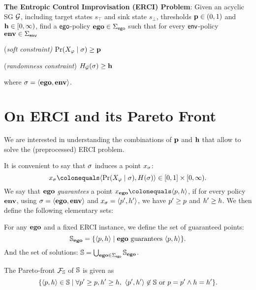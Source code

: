 {{{\begin{mdframed}
\textbf{The Entropic Control Improvisation (ERCI) Problem}:
Given an acyclic SG $\mathcal{G}$, including target states $s_\top$ and sink state $s_\bot$, thresholds $\mathbf{p} \in (0,1)$ and $\mathbf{h} \in [0,\infty)$,  find a $\mathsf{ego}$-policy $\mathbf{ego} \in \Sigma_{\mathsf{ego}}$  such that for every $\mathsf{env}$-policy $\mathbf{env} \in \Sigma_{\mathsf{env}}$ \begin{compactenum}
	\item (\emph{soft constraint)} $\Pr(X_\varphi \mid \sigma) \geq \mathbf{p}$
\item (\emph{randomness constraint}) $H_{\mathcal{G}}(\sigma) \geq \mathbf{h}$
\end{compactenum}
where  $\sigma = \langle \mathbf{ego}, \mathbf{env} \rangle$.
\end{mdframed}

\begin{example}
	
\end{example}


\section{On ERCI and its Pareto Front}

We are interested in understanding the combinations of $\mathbf{p}$ and $\mathbf{h}$ that allow to solve the (preprocessed) ERCI problem. 

It is convenient to say that $\sigma$ induces a point $x_\sigma$: \[x_\sched \colonequals \langle \Pr(X_\varphi \mid \sched), H(\sched)  \rangle \in [0,1] \times [0,\infty).\] 
We say that $\mathbf{ego}$ \emph{guarantees} a point $x_\pOneSched \colonequals \langle \scp, \rndp \rangle$, if for every policy $\mathbf{env}$, using $\sigma = \langle \mathbf{ego}, \mathbf{env} \rangle$ and $x_\sigma = \langle p', h' \rangle$, we have $p' \geq p$ and $h' \geq h$.
We then define the following elementary sets:
\begin{definition}[Solutions]
For any $\mathbf{ego}$ and a fixed ERCI instance, we define the set of guaranteed points:
  \[ \mathbb{S}_{\mathbf{ego}} = \{ \langle p, h \rangle \mid  \mathbf{ego} \text{ guarantees } \langle p, h \rangle \}. \]
And the set of solutions:    	
 $ \mathbb{S} = \bigcup_{\mathbf{ego} \in \Sigma_{\mathsf{ego}}} \mathbb{S}_{\mathbf{ego}}$.
\end{definition}
The Pareto-front $\mathcal{F}_{\mathbb{S}}$ of $\mathbb{S}$ is given as \[ \{ \langle p, h \rangle \in \mathbb{S} \mid \forall p' \geq p, h' \geq h, \ \langle p', h' \rangle \not\in \mathbb{S} \text{ or } p = p' \land  h = h'  \}. \]

}}}
